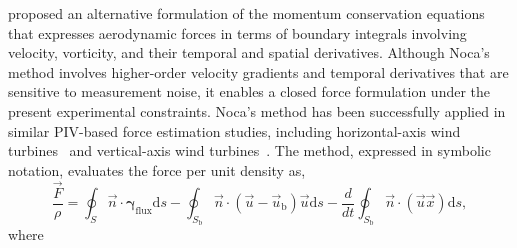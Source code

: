\documentclass[wes, manuscript]{copernicus}
\begin{document}
\cite{Noca1999} proposed an alternative formulation of the momentum conservation equations that expresses aerodynamic forces in terms of boundary integrals involving velocity, vorticity, and their temporal and spatial derivatives.
Although Noca’s method involves higher-order velocity gradients and temporal derivatives that are sensitive to measurement noise, it enables a closed force formulation under the present experimental constraints.
Noca’s method has been successfully applied in similar PIV-based force estimation studies, including horizontal-axis wind turbines~\citep{Fritz2024a,Fritz2024b} and vertical-axis wind turbines~\citep{LeBlanc2022}.
The method, expressed in symbolic notation, evaluates the force per unit density as,
\begin{equation}\label{eq:Noca}
    \frac{\vec{F}}{\rho} = \oint_{{S}} \vec{n}\cdot \boldsymbol{\gamma}_\textrm{flux}   \textrm{d}s - \oint_{{S}_{\textrm{b}}} \vec{n}\cdot \left(\vec{u} - \vec{u}_{\textrm{b}}\right) \vec{u}   \textrm{d}s - \frac{{d}}{{d}t} \oint_{{S}_{\textrm{b}}} \vec{n}\cdot \left(\vec{u}\vec{x}\right)   \textrm{d}s ,
\end{equation}
where
\end{document}
